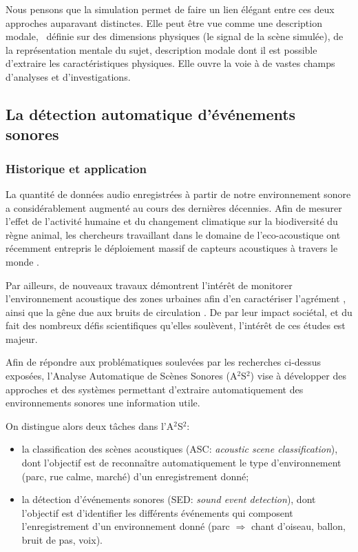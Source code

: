 Nous pensons que la simulation permet de faire un lien élégant entre ces deux approches auparavant distinctes. Elle peut être vue comme une description modale, \ie~définie sur des dimensions physiques (le signal de la scène simulée), de la représentation mentale du sujet, description modale dont il est possible d'extraire les caractéristiques physiques. Elle ouvre la voie à de vastes champs d'analyses et d'investigations.


\subsection{La détection automatique d'événements sonores}
\label{ch1_SED}

\subsubsection{Historique et application}

La quantité de données audio enregistrées à partir de notre environnement sonore a considérablement augmenté au cours des dernières décennies. Afin de mesurer l'effet de l'activité humaine et du changement climatique sur la biodiversité du règne animal, les chercheurs travaillant dans le domaine de l'eco-acoustique \citep{ecoacoustic2014,krause} ont récemment entrepris le déploiement massif de capteurs acoustiques à travers le monde \citep{warren2006urban,nessSST13,stowell13a,stowell13b}.

Par ailleurs, de nouveaux travaux démontrent l'intérêt de monitorer l'environnement acoustique des zones urbaines afin d'en caractériser l'agrément \citep{guyot2005urban,ricciardi2015sound}, ainsi que la gêne due aux bruits de circulation \citep{gloaguen2016}. De par leur impact sociétal, et du fait des nombreux défis scientifiques qu'elles soulèvent, l'intérêt de ces études est majeur.

Afin de répondre aux problématiques soulevées par les recherches ci-dessus exposées, l'Analyse Automatique de Scènes Sonores (A$^2$S$^2$) \citep{Stowell15} vise à développer des approches et des systèmes permettant d'extraire automatiquement des environnements sonores une information utile.

On distingue alors deux tâches dans l'A$^2$S$^2$:

\begin{itemize}
\item la classification des scènes acoustiques (ASC: \emph{acoustic scene classification}), dont l'objectif est de reconnaître automatiquement le type d'environnement (parc, rue calme, marché) d'un enregistrement donné;
\item la détection d'événements sonores (SED: \emph{sound event detection}), dont l'objectif est d'identifier les différents événements qui composent l'enregistrement d'un environnement donné (parc $\Rightarrow$ chant d'oiseau, ballon, bruit de pas, voix).
\end{itemize}

